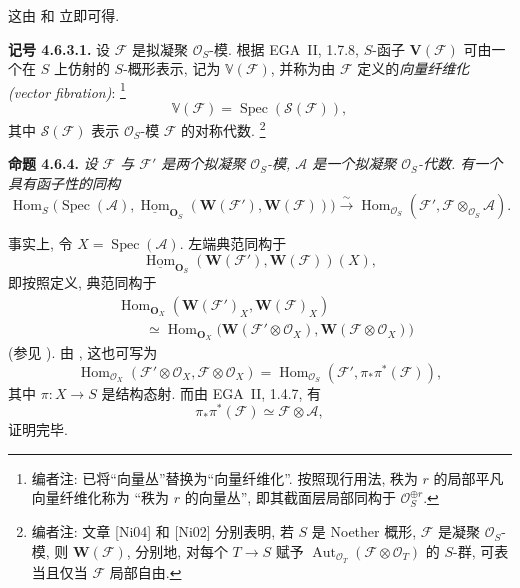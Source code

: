 \begin{figure}[H]
  \centering
  
  \label{fig:sga3-exp1-p026-prop463-canonical-morphisms}
\end{figure}

这由  和
 立即可得.

\medskip
\noindent{}\textbf{记号 4.6.3.1.}
设 \(\mathscr F\) 是拟凝聚 \(\mathcal O_S\)-模. 根据 EGA~II, 1.7.8,
\(S\)-函子 \(\mathbf V(\mathscr F)\) 可由一个在 \(S\) 上仿射的
\(S\)-概形表示, 记为 \(\mathbb V(\mathscr F)\), 并称为由
\(\mathscr F\) 定义的\emph{向量纤维化 (vector fibration)}:
\footnote{编者注: 已将``向量丛''替换为``向量纤维化''.
按照现行用法, 秩为 \(r\) 的局部平凡向量纤维化称为
``秩为 \(r\) 的向量丛'', 即其截面层局部同构于
\(\mathcal O_S^{\oplus r}\).}
\[
  \mathbb V(\mathscr F)=\operatorname{Spec}(\mathcal S(\mathscr F)),
\]
其中 \(\mathcal S(\mathscr F)\) 表示 \(\mathcal O_S\)-模
\(\mathscr F\) 的对称代数.
\footnote{编者注: 文章 [Ni04] 和 [Ni02] 分别表明, 若 \(S\)
是 Noether 概形, \(\mathscr F\) 是凝聚 \(\mathcal O_S\)-模,
则 \(\mathbf W(\mathscr F)\), 分别地, 对每个 \(T\to S\)
赋予 \(\operatorname{Aut}_{\mathcal O_T}
(\mathscr F\otimes\mathcal O_T)\) 的 \(S\)-群, 可表当且仅当
\(\mathscr F\) 局部自由.}

\medskip
\noindent{}\textbf{命题 4.6.4.}
\textit{设 \(\mathscr F\) 与 \(\mathscr F'\) 是两个拟凝聚
\(\mathcal O_S\)-模, \(\mathscr A\) 是一个拟凝聚 \(\mathcal O_S\)-代数.
有一个具有函子性的同构
\[
  \operatorname{Hom}_S
   \bigl(\operatorname{Spec}(\mathscr A),
     \underline{\operatorname{Hom}}_{\mathbf O_S}
       (\mathbf W(\mathscr F'),\mathbf W(\mathscr F))\bigr)
  \xrightarrow{\ \sim\ }
  \operatorname{Hom}_{\mathcal O_S}
    (\mathscr F',\mathscr F\otimes_{\mathcal O_S}\mathscr A).
\]}

事实上, 令 \(X=\operatorname{Spec}(\mathscr A)\). 左端典范同构于
\[
  \underline{\operatorname{Hom}}_{\mathbf O_S}
    (\mathbf W(\mathscr F'),\mathbf W(\mathscr F))(X),
\]
即按照定义, 典范同构于
\begin{align*}
  &\operatorname{Hom}_{\mathbf O_X}
    (\mathbf W(\mathscr F')_X,\mathbf W(\mathscr F)_X)\\
  &\qquad\simeq
  \operatorname{Hom}_{\mathbf O_X}
    \bigl(\mathbf W(\mathscr F'\otimes\mathcal O_X),
          \mathbf W(\mathscr F\otimes\mathcal O_X)\bigr)
\end{align*}
(参见 ).
由 , 这也可写为
\[
  \operatorname{Hom}_{\mathcal O_X}
    (\mathscr F'\otimes\mathcal O_X,\mathscr F\otimes\mathcal O_X)
  =
  \operatorname{Hom}_{\mathcal O_S}
    (\mathscr F',\pi_*\pi^*(\mathscr F)),
\]
其中 \(\pi:X\to S\) 是结构态射. 而由 EGA~II, 1.4.7, 有
\[
  \pi_*\pi^*(\mathscr F)\simeq\mathscr F\otimes\mathscr A,
\]
证明完毕.

